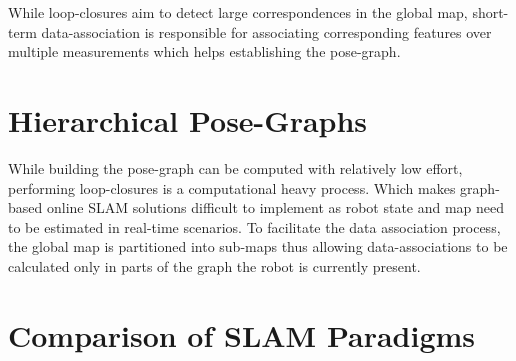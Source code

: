 While loop-closures aim to detect large correspondences in the global map, short-term data-association is responsible for associating corresponding features over multiple measurements which helps establishing the pose-graph. 

\section{Hierarchical Pose-Graphs}
While building the pose-graph can be computed with relatively low effort, performing loop-closures is a computational heavy process. Which makes graph-based online SLAM solutions difficult to implement as robot state and map need to be estimated in real-time scenarios. To facilitate the data association process, the global map is partitioned into sub-maps thus allowing data-associations to be calculated only in parts of the graph the robot is currently present. 

\section{Comparison of SLAM Paradigms}





